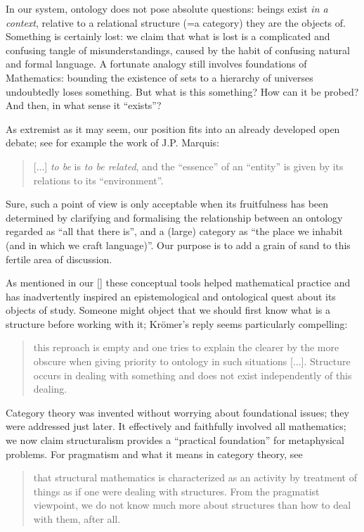 In our system, ontology does not pose absolute questions: beings exist \emph{in a context}, relative to a relational structure (=a category) they are the objects of. Something is certainly lost: we claim that what is lost is a complicated and confusing tangle of misunderstandings, caused by the habit of confusing natural and formal language. A fortunate analogy still involves foundations of Mathematics: bounding the existence of sets to a hierarchy of universes undoubtedly loses something. But what is this something? How can it be probed? And then, in what sense it ``exists''?

As extremist as it may seem, our position fits into an already developed open debate; see for example the work of J.P. Marquis:
\begin{quote}
    [...] \emph{to be} is \emph{to be related}, and the ``essence'' of an ``entity'' is given by its relations to its ``environment''.
    \hfill \cite{Marquis1997}
\end{quote}
Sure, such a point of view is only acceptable when its fruitfulness has been determined by clarifying and formalising the relationship between an ontology regarded as ``all that there is'', and a (large) category as ``the place we inhabit (and in which we craft language)''. Our purpose is to add a grain of sand to this fertile area of discussion.

As mentioned in our \autoref{} these conceptual tools helped mathematical practice and has inadvertently inspired an epistemological and ontological quest about its objects of study. Someone might object that we should first know what is a structure before working with it; Kr\"omer's reply seems particularly compelling:
\begin{quote}
    this reproach is empty and one tries to explain the clearer by the more obscure when giving priority to ontology in such situations [...]. Structure occurs in dealing with something and does not exist independently of this dealing. \cite{kromer2007tool}
\end{quote}
Category theory was invented without worrying about foundational issues; they were addressed just later. It effectively and faithfully involved all mathematics; we now claim structuralism provides a ``practical foundation'' for metaphysical problems. For pragmatism and what it means in category theory, see
\begin{quote}
    that structural mathematics is characterized as an activity by treatment of things as if one were dealing with structures. From the pragmatist viewpoint, we do not know much more about structures than how to deal with them, after all. \hfill \cite{kromer2007tool}
\end{quote}
